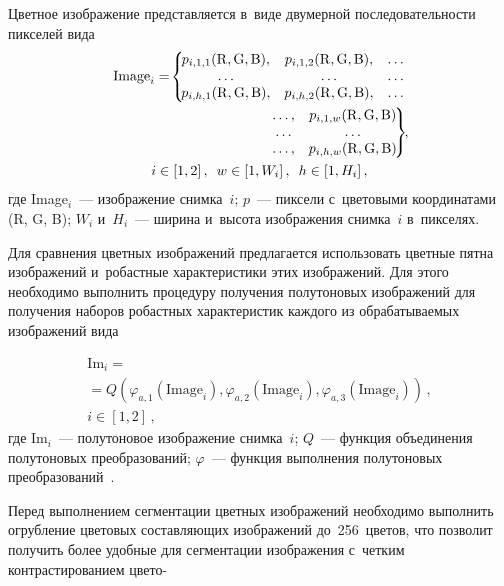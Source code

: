 \begin{multicols}{2}
  Цветное изображение представляется в~виде двумерной 
последовательности пикселей вида
  \begin{multline*}
  \mathrm{Image}_i = \!\left\{\!
  \begin{matrix}
  p_{i,1,1}(\mathrm{R,G,B}), & p_{i,1,2}(\mathrm{R,G,B}), &\ldots\\ 
  \ldots  &\ldots  &\ldots\\
  p_{i,h,1}(\mathrm{R,G,B}), & p_{i,h,2}(\mathrm{R,G,B}), &\ldots\end{matrix}\right.\\ 
\hspace*{40mm}\left.\begin{matrix}\ldots, &p_{i,1,w}(\mathrm{R,G,B})\\
\ldots &\ldots\\
\ldots, &p_{i,h,w}(\mathrm{R,G,B})
  \end{matrix}\!
  \right\}\!\!,\hspace*{-0.7966pt}\\
   i\in [1, 2]\,,\enskip
  w\in [1, W_i]\,,\enskip h\in [1, H_i]\,,
  \end{multline*}
где Image$_i$~--- изображение снимка~$i$;
$p$~--- пиксели с~цветовыми координатами (R, G, B);
$W_i$ и~$H_i$~--- ширина и~высота изображения снимка~$i$ в~пикселях. 

  Для сравнения цветных изображений предлагается использовать цветные 
пятна изображений и~робастные характеристики этих изображений. Для 
этого необходимо выполнить процедуру получения полутоновых 
изображений для получения наборов робастных характеристик каждого из 
обра\-ба\-ты\-ва\-емых изображений вида

\noindent
  \begin{multline*}
  \mathrm{Im}_i ={}\\
  {}=Q\left(\varphi_{a,1}(\mathrm{Image}_i),   
\varphi_{a,2 }(\mathrm{Image}_i), 
\varphi_{a,3}(\mathrm{Image}_i)\right)\,,\\
  i\in [1, 2]\,,
  \end{multline*}
где Im$_i$~--- полутоновое изоб\-ра\-же\-ние снимка~$i$;
$Q$~--- функция объединения полутоновых преобразований;
$\varphi$~--- функция выполнения полутоновых преобразований~\cite{4-ar}.
  
  Перед выполнением сегментации цветных изоб\-ра\-же\-ний необходимо 
выполнить огрубление цветовых составляющих изображений до~256~цветов, 
что позволит получить более удобные для сегментации
изображения 
с~четким контрастированием цвето-\linebreak\vspace*{-12pt}


\end{multicols}
